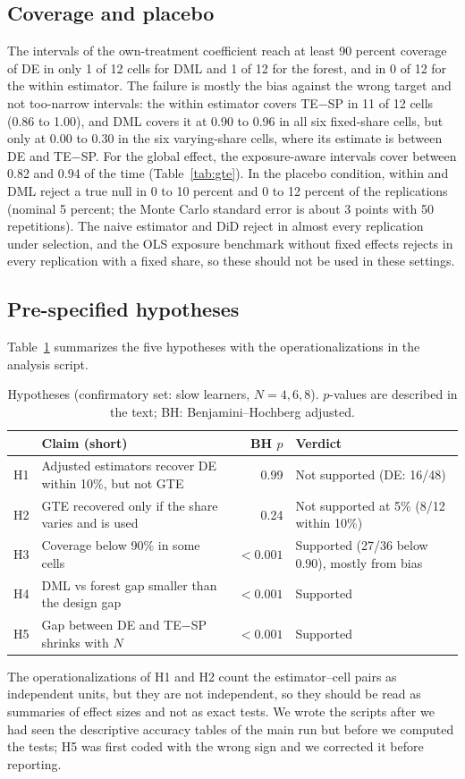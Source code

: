 \documentclass[11pt]{article}
\begin{document}
\subsection{Coverage and placebo}\label{app:placebo}
The intervals of the own-treatment coefficient reach at least 90 percent coverage of DE in only 1 of 12 cells for DML and 1 of 12 for the forest, and in 0 of 12 for the within estimator. The failure is mostly the bias against the wrong target and not too-narrow intervals: the within estimator covers TE$-$SP in 11 of 12 cells (0.86 to 1.00), and DML covers it at 0.90 to 0.96 in all six fixed-share cells, but only at 0.00 to 0.30 in the six varying-share cells, where its estimate is between DE and TE$-$SP. For the global effect, the exposure-aware intervals cover between 0.82 and 0.94 of the time (Table~\ref{tab:gte}). In the placebo condition, within and DML reject a true null in 0 to 10 percent and 0 to 12 percent of the replications (nominal 5 percent; the Monte Carlo standard error is about 3 points with 50 repetitions). The naive estimator and DiD reject in almost every replication under selection, and the OLS exposure benchmark without fixed effects rejects in every replication with a fixed share, so these should not be used in these settings.

\subsection{Pre-specified hypotheses}
Table~\ref{tab:hyp} summarizes the five hypotheses with the operationalizations in the analysis script.
\begin{table}[t]\centering\small\caption{Hypotheses (confirmatory set: slow learners, $N=4,6,8$). $p$-values are described in the text; BH: Benjamini--Hochberg adjusted.}\label{tab:hyp}
\begin{tabular}{lp{5.4cm}rp{4.6cm}}\toprule
 & Claim (short) & BH $p$ & Verdict\\\midrule
H1 & Adjusted estimators recover DE within 10\%, but not GTE & 0.99 & Not supported (DE: 16/48)\\
H2 & GTE recovered only if the share varies and is used & 0.24 & Not supported at 5\% (8/12 within 10\%)\\
H3 & Coverage below 90\% in some cells & $<0.001$ & Supported (27/36 below 0.90), mostly from bias\\
H4 & DML vs forest gap smaller than the design gap & $<0.001$ & Supported\\
H5 & Gap between DE and TE$-$SP shrinks with $N$ & $<0.001$ & Supported\\\bottomrule
\end{tabular}\end{table}
The operationalizations of H1 and H2 count the estimator--cell pairs as independent units, but they are not independent, so they should be read as summaries of effect sizes and not as exact tests. We wrote the scripts after we had seen the descriptive accuracy tables of the main run but before we computed the tests; H5 was first coded with the wrong sign and we corrected it before reporting.
\end{document}
